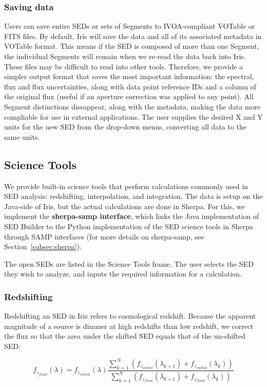 \documentclass[preprint,12pt,3p]{elsarticle}
\begin{document}
\subsubsection{Saving data}
Users can save entire SEDs or sets of Segments to IVOA-compliant VOTable or FITS files. By default, Iris will save the data and all of its associated metadata in VOTable format. This means if the SED is composed of more than one Segment, the individual Segments will remain when we re-read the data back into Iris. These files may be difficult to read into other tools. Therefore, we provide a simpler output format that saves the most important information: the spectral, flux and flux uncertainties, along with data point reference IDs and a column of the original flux (useful if an aperture correction was applied to any point). All Segment distinctions dissappear, along with the metadata, making the data more compliable for use in external applications. The user supplies the desired X and Y units for the new SED from the drop-down menus, converting all data to the same units.

\subsection{Science Tools}
We provide built-in science tools that perform calculations commonly used in SED analysis: redshifting, interpolation, and integration. The data is setup on the Java-side of Iris, but the actual calculations are done in Sherpa. For this, we implement the \textbf{sherpa-samp interface}, which links the Java implementation of SED Builder to the Python implementation of the SED science tools in Sherpa through SAMP interfaces (for more details on sherpa-samp, see Section~\ref{subsec:sherpa}).

The open SEDs are listed in the Science Tools frame. The user selects the SED they wish to analyze, and inputs the required information for a calculation.

\subsubsection{Redshifting}
Redshifting an SED in Iris refers to cosmological redshift. Because the apparent magnitude of a source is dimmer at high redshifts than low redshift, we correct the flux so that the area under the shifted SED equals that of the un-shifted SED:

\begin{equation} \label{eq:redshift}
f_{z_{final}}(\lambda) = f_{z_{initial}}(\lambda) \frac{\sum_{k=1}^N (f_{z_{initial}}(\lambda_{k+1})+f_{z_{initial}}(\lambda_{k}))}{\sum_{k=1}^N (f_{z_{final}}(\lambda_{k+1})+f_{z_{final}}(\lambda_{k}))}
\end{equation}
\end{document}
